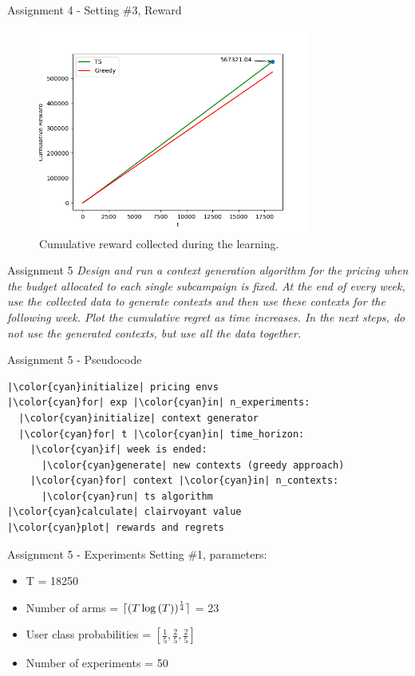 \documentclass[11pt]{beamer}
\DeclarePairedDelimiter{\ceil}{\lceil}{\rceil}
\begin{document}
\begin{frame}{Assignment 4 - Setting \#3, Reward}
\begin{figure}[hbtp]
\centering
\includegraphics[width=0.8\textwidth]{images/assignment_4_exp_3_cum_reward.png}
\caption{Cumulative reward collected during the learning.}
\end{figure}
\end{frame}

\begin{frame}{Assignment 5}
\textit{Design and run a context generation algorithm for the pricing when the budget allocated to each single subcampaign is fixed. At the end of every week, use the collected data to generate contexts and then use these contexts for the following week. Plot the cumulative regret as time increases. In the next steps, do not use the generated contexts, but use all the data together.}
\end{frame}

\begin{frame}[fragile]{Assignment 5 - Pseudocode}
\begin{lstlisting}
|\color{cyan}initialize| pricing envs
|\color{cyan}for| exp |\color{cyan}in| n_experiments:
  |\color{cyan}initialize| context generator 
  |\color{cyan}for| t |\color{cyan}in| time_horizon:
    |\color{cyan}if| week is ended:
      |\color{cyan}generate| new contexts (greedy approach)
    |\color{cyan}for| context |\color{cyan}in| n_contexts:
      |\color{cyan}run| ts algorithm
|\color{cyan}calculate| clairvoyant value
|\color{cyan}plot| rewards and regrets
\end{lstlisting}
\end{frame}

\begin{frame}{Assignment 5 - Experiments}
Setting \#1, parameters:
\begin{itemize}
\item T = 18250
\item Number of arms = $\ceil{(T \log{(T)})^{\frac{1}{4}}}$ = 23
\item User class probabilities = $[\frac{1}{5}, \frac{2}{5}, \frac{2}{5}]$
\item Number of experiments = 50
\end{itemize}
\end{frame}
\end{document}
